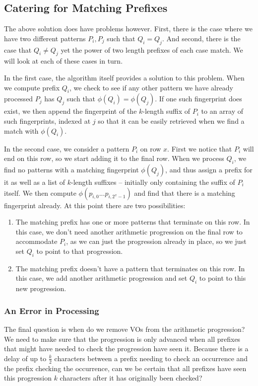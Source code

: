 \documentclass[ %
                    author={Dominic Joseph Moylett},
                    degree={MEng},
                     title={Dictionary Matching with Fingerprints},
                  subtitle={An Empirical Analysis},
                      type={research},
                      year={2015} ]{dissertation}
\begin{document}
\subsection{Catering for Matching Prefixes}

The above solution does have problems however. First, there is the case where we have two different patterns $P_i, P_j$ such that $Q_i = Q_j$. And second, there is the case that $Q_i \neq Q_j$ yet the power of two length prefixes of each case match. We will look at each of these cases in turn.

In the first case, the algorithm itself provides a solution to this problem. When we compute prefix $Q_i$, we check to see if any other pattern we have already processed $P_j$ has $Q_j$ such that $\phi(Q_i) = \phi(Q_j)$. If one such fingerprint does exist, we then append the fingerprint of the $k$-length suffix of $P_i$ to an array of such fingerprints, indexed at $j$ so that it can be easily retrieved when we find a match with $\phi(Q_i)$.

In the second case, we consider a pattern $P_i$ on row $x$. First we notice that $P_i$ will end on this row, so we start adding it to the final row. When we process $Q_i$, we find no patterns with a matching fingerprint $\phi(Q_j)$, and thus assign a prefix for it as well as a list of $k$-length suffixes -- initially only containing the suffix of $P_i$ itself. We then compute $\phi(p_{i,0}...p_{i,2^x-1})$ and find that there is a matching fingerprint already. At this point there are two possibilities:

\begin{enumerate}
  \item The matching prefix has one or more patterns that terminate on this row. In this case, we don't need another arithmetic progression on the final row to accommodate $P_i$, as we can just the progression already in place, so we just set $Q_i$ to point to that progression.
  \item The matching prefix doesn't have a pattern that terminates on this row. In this case, we add another arithmetic progression and set $Q_i$ to point to this new progression.
\end{enumerate}

\subsubsection{An Error in Processing}
\label{sssec:error-prob}

The final question is when do we remove VOs from the arithmetic progression? We need to make sure that the progression is only advanced when all prefixes that might have needed to check the progression have seen it. Because there is a delay of up to $\frac{k}{2}$ characters between a prefix needing to check an occurrence and the prefix checking the occurrence, can we be certain that all prefixes have seen this progression $k$ characters after it has originally been checked?
\end{document}
